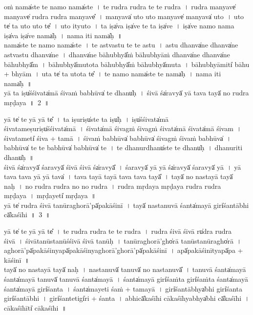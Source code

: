 \documentclass[parskip, DIV=14]{scrartcl}
\begin{document}
{oṁ nama̍ste te॒ namo॒ nama̍ste~।
te॒ ru॒dra॒ ru॒dra॒ te॒ te॒ ru॒dra॒~।
ru॒dra॒ ma॒nyave̍ ma॒nyave̍ rudra rudra ma॒nyave̎~।
ma॒nyava̍ u॒to u॒to  ma॒nyave̍ ma॒nyava̍ u॒to~।
u॒to te̍ ta u॒to u॒to te̎~।
u॒to ityu॒to~।
ta॒ iṣa̍va॒ iṣa̍ve te ta॒  iṣa̍ve~।
iṣa̍ve॒ namo॒ nama॒ iṣa̍va॒ iṣa̍ve॒ nama̍ḥ~।
nama॒ iti॒ nama̍ḥ~॥ \\

nama̍ste te॒ namo॒ nama̍ste~।
te॒ a॒stva॒stu॒ te॒ te॒ a॒stu॒~।
a॒stu॒ dhanva̍ne॒ dhanva̍ne astvastu॒ dhanva̍ne~।
dhanva̍ne bā॒hubhyā̎ṁ bā॒hubhyā॒ṁ dhanva̍ne॒ dhanva̍ne bā॒hubhyā̎m~।
bā॒hubhyā̍mu॒tota bā॒hubhyā̎ṁ bā॒hubhyā̍mu॒ta~।
bā॒hubhyā॒miti̍ bā॒hu + bhyā॒m~।
u॒ta te̍ ta u॒tota te̎~।
te॒ namo॒ nama̍ste te॒ nama̍ḥ~। 
nama॒ iti॒ nama̍ḥ~॥ \\

\vspace{0.5cm}
yā ta॒ iṣu̍śśi॒vata̍mā śi॒vaṁ ba॒bhūva̍ te॒ dhanu̍ḥ~।
śi॒vā śa̍ra॒vyā̍ yā tava॒ tayā̍ no rudra mṛḍaya~॥~2~॥

yā te̍ te॒ yā yā te̎~। 
ta॒ iṣu॒riṣu̍ste ta॒ iṣu̍ḥ~। 
iṣu̍śśi॒vata̍mā śi॒vata॒meṣu॒riṣu̍śśi॒vata̍mā~। 
śi॒vata̍mā śi॒vagṁ śi॒vagṁ śi॒vata̍mā śi॒vata̍mā śi॒vam~।
śi॒vata॒meti̍ śi॒va + ta॒mā॒~। 
śi॒va॒ṁ babhūva̍ ba॒bhūva̍ śi॒vagṁ śi॒vaṁ ba॒bhūva̍~। 
ba॒bhūva̍ te te ba॒bhūva̍ ba॒bhūva̍ te~। 
te॒ dhanu॒rdhanu̍ste te॒ dhanu̍ḥ~। 
dhanu॒riti॒  dhanu̍ḥ~॥ \\
 
\vspace{0.5cm}
śi॒vā śa̍ra॒vyā̍ śara॒vyā̍ śi॒vā śi॒vā śa̍ra॒vyā̎~। 
śa॒ra॒vyā̍ yā yā śa̍ra॒vyā̍ śara॒vyā̍ yā~। 
yā tava॒ tava॒ yā yā tava̍~। 
tava॒ tayā॒ tayā॒ tava॒ tava॒ tayā̎~। 
tayā̍ no na॒stayā॒ tayā̍ naḥ~। 
no॒ ru॒dra॒ ru॒dra॒  no॒ no॒ ru॒dra॒~। 
ru॒dra॒  mṛ॒da॒ya॒ mṛ॒ḍa॒ya॒ ru॒dra॒  ru॒dra॒ mṛ॒ḍa॒ya॒~। 
mṛ॒ḍa॒yeti̍  mṛḍaya~॥\\ 

\vspace{0.5cm}
yā te̍ rudra śi॒vā ta॒nūragho॒rā'pā̍pakāśinī~। 
tayā̍ nasta॒nuvā॒ śanta̍mayā॒ giri̍śantā॒bhi cā̍kaśīhi~॥~3~॥

yā te̍ te॒ yā yā te̎~। 
te॒ ru॒dra॒ ru॒dra॒ te॒ te॒ ru॒dra॒~। 
ru॒dra॒ śi॒vā śi॒vā ru̍dra rudra śi॒vā~। 
śi॒vāta॒nūsta॒nūśśi॒vā śi॒vā ta॒nūḥ~। 
ta॒nūragho॒rā'gho̍rā ta॒nūsta॒nūragho̍rā~। 
agho॒rā'pā̍pakāśi॒nyapā̍pakāśi॒nyagho॒rā'gho॒rā'pā̍pakāśinī~। 
apā̍pakāśi॒nītyapā̍pa + kā॒śi॒nī॒~॥\\

\vspace{0.5cm}
tayā̍ no na॒stayā॒ tayā̍ naḥ~। 
na॒sta॒nuvā̍ ta॒nuvā̍ no nasta॒nuvā̎~। 
ta॒nuvā॒ śanta̍mayā॒ śanta̍mayā ta॒nuvā̍ ta॒nuvā॒ śanta̍mayā~। 
śanta̍mayā॒ giri̍śaṁta॒ giri̍śaṁta॒ śanta̍mayā॒ śanta̍mayā॒ giri̍śanta~। 
śanta̍ma॒yeti॒ śaṁ + ta॒ma॒yā॒~। giri̍śantā॒bhya̍bhi giri̍śanta॒ giri̍śantā॒bhi~। 
giri̍śa॒nteti॒gi̍ri + śa॒nta॒~। 
a॒bhicā̍kaśīhi cākaśīhya॒bhya̍bhi cā̍kaśīhi~। 
cā॒ka॒śī॒hīti̍  cākaśīhi~॥\\ 

}
\end{document}
